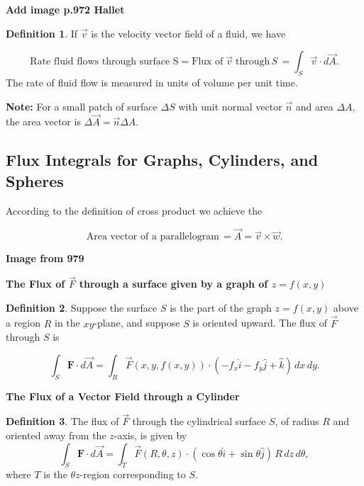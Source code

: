 \documentclass[12pt, a4paper]{article}
\theoremstyle{plain}
\theoremstyle{definition}
\newtheorem{definition}{Definition}[section]
\theoremstyle{remark}
\begin{document}
\textbf{Add image p.972 Hallet}

\begin{definition}
If $\vec{v}$ is the velocity vector field of a fluid, we have 

$$\text{Rate fluid flows through surface S} = \text{Flux of} \; \vec{v} \; \text{through} \, S \, = \int_S \vec{v} \cdot d\vec{A}.$$
The rate of fluid flow is measured in units of volume per unit time.
\end{definition}

\vspace{.025in}

\textbf{Note:} For a small patch of surface $\Delta S$ with unit normal vector $\vec{n}$ and area $\Delta A$, the area vector is $\Delta \vec{A} = \vec{n} \Delta A$. 

\vspace{.025in}










\subsection{Flux Integrals for Graphs, Cylinders, and Spheres}

According to the definition of cross product we achieve the 

$$\text{Area vector of a parallelogram} \, = \vec{A} = \vec{v} \times \vec{w}.$$

\textbf{Image from 979}
\vspace{.05in}

\textbf{The Flux of $\vec{F}$ through a surface given by a graph of $z = f(x, y)$}

\begin{definition}
Suppose the surface $S$ is the part of the graph $z= f(x, y)$ above a region $R$ in the $xy$-plane, and suppose $S$ is oriented upward. The flux of $\vec{F}$ through $S$ is 

$$  \int_S \textbf{F} \cdot d \vec{A} = \int_R \vec{F}(x, y, f(x,y)) \cdot (-f_x \hat{i} - f_y \hat{j} + \hat{k}) \,dx \,dy.$$
\end{definition}


\textbf{The Flux of a Vector Field through a Cylinder}

\begin{definition}
The flux of $\vec{F}$ through the cylindrical surface $S$, of radius $R$ and oriented away from the $z$-axis, is given by
$$ \int_S \textbf{F} \cdot d \vec{A} = \int_T \vec{F}(R, \theta, z) \cdot (\cos \theta \hat{i} + \sin \theta \hat{j}) \,R\,dz\,d\theta,  $$
where $T$ is the $\theta z$-region corresponding to $S$.
\end{definition}
\end{document}
